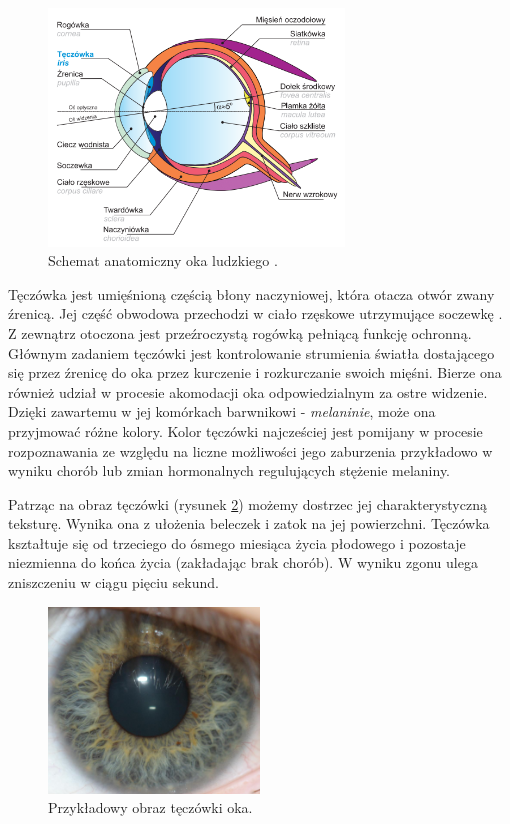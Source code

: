 \documentclass[10pt,polish,a4paper,oneside]{ppfcmthesis}
\begin{document}
\begin{figure}[ht]
  \centering
  \includegraphics[width=0.7\textwidth]{images/intro/eyeStructure.png}
  \caption{Schemat anatomiczny oka ludzkiego \cite{Czajka}.}
  \label{fig:eyeStructure}
\end{figure}

Tęczówka jest umięśnioną częścią błony naczyniowej, która otacza otwór zwany \'zrenicą.
Jej częś\'c obwodowa przechodzi w ciało rzęskowe utrzymujące soczewkę \cite{Czajka}. Z zewnątrz
otoczona jest prze\'zroczystą rogówką pełniącą funkcję ochronną. Głównym zadaniem tęczówki
jest kontrolowanie strumienia światła dostającego się przez \'zrenicę do oka przez kurczenie i
rozkurczanie swoich mięśni. Bierze ona również udział w procesie akomodacji oka odpowiedzialnym
za ostre widzenie. Dzięki zawartemu w jej komórkach barwnikowi - \textit{melaninie}, może ona przyjmowa\'c różne kolory.
Kolor tęczówki najcześciej jest pomijany w procesie rozpoznawania ze względu na liczne możliwości
jego zaburzenia przykładowo w wyniku chorób lub zmian hormonalnych regulujących stężenie melaniny.

Patrząc na obraz tęczówki (rysunek \ref{fig:irisExample}) możemy dostrzec jej charakterystyczną teksturę. Wynika ona z ułożenia
beleczek i zatok na jej powierzchni. Tęczówka kształtuje się od trzeciego do ósmego miesiąca życia
płodowego i pozostaje niezmienna do końca życia (zakładając brak chorób).
W wyniku zgonu ulega zniszczeniu w ciągu pięciu sekund.

\begin{figure}[ht]
  \centering
  \includegraphics[width=0.5\textwidth]{images/intro/irisExample.png}
  \caption{Przykładowy obraz tęczówki oka.}
  \label{fig:irisExample}
\end{figure}
\end{document}
